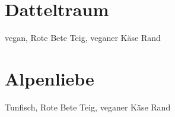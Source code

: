 \documentclass{article}
\begin{document}
\section*{Datteltraum}
vegan, Rote Bete Teig, veganer Käse Rand
\section*{Alpenliebe}
Tunfisch, Rote Bete Teig, veganer Käse Rand
\end{document}

